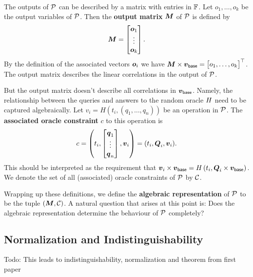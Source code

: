 The outputs of $\P$ can be described by a matrix with entries in $\F$.
Let $o_1, \dots, o_k$ be the output variables of $\P$.
Then the \textbf{output matrix} $\M$ of $\P$ is defined by
\[
  \M =
  \begin{bmatrix}
  \v o_1\\
  \vdots \\
  \v o_k
  \end{bmatrix}
  .
\]
By the definition of the associated vectors $\v o_i$ we have
$
\M \times \vbase = 
  \begin{bmatrix} 
  o_1, 
  \dots,
  o_k 
  \end{bmatrix}^\top
$.
The output matrix describes the linear correlations in the output of $\P$.

But the output matrix doesn't describe all correlations in $\vbase$.
Namely, the relationship between the queries and answers to the random oracle $\H$ need to be captured algebraically.
Let $v_i = H(t_i, (q_1, \dots, q_n))$ be an operation in $\P$.
The \textbf{associated oracle constraint} $c$ to this operation is
\[
  c = \left( t_i, \begin{bmatrix}
  \v q_1 \\
  \vdots \\
  \v q_n
  \end{bmatrix},
  \v v_i \right)
	=
	(t_i, \Q_i, \v v_i)
	.
\]
This should be interpreted as the requirement that
$
\v v_i \times \vbase = \H \left( t_i, \Q_i \times \vbase \right)
$.
We denote the set of all (associated) oracle constraints of $\P$ by $\C$.

Wrapping up these definitions,
we define the \textbf{algebraic representation} of $\P$ to be the tuple $(\M, \C)$.
A natural question that arises at this point is:
Does the algebraic representation determine the behaviour of $\P$ completely?

\subsection{Normalization and Indistinguishability}

Todo: This leads to indistinguishability, normalization and theorem from first paper

